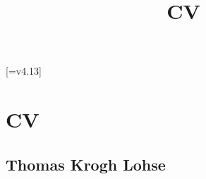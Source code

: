 \usepackage[utf8]{inputenc}
\usepackage{anysize}
\usepackage[a4paper,margin=7em]{geometry}
\usepackage{float}
\usepackage{graphicx} %
\usepackage{booktabs}
\usepackage{hyperref}
\usepackage{fontawesome5}
\usepackage{multirow}
\usepackage{array}
\usepackage{lipsum}
\usepackage[export]{adjustbox}
\usepackage{marvosym}
\usepackage{tabularx}
\usepackage{tabu}
\usepackage{longtable}[=v4.13]
\usepackage{enumitem}

\def\secsep{\hrule width5cm}
\title{\bfseries\Huge CV}

\section*{\centering \Huge CV}\subsection*{\centering Thomas Krogh Lohse}

